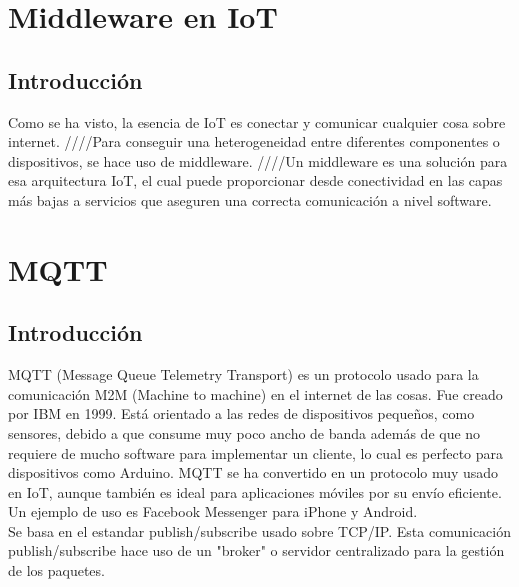 \documentclass[12pt, twoside]{book}
\begin{document}
\chapter{Middleware en IoT}
\section{Introducción}
Como se ha visto, la esencia de IoT es conectar y comunicar cualquier cosa sobre internet. ////Para conseguir una heterogeneidad entre diferentes componentes o dispositivos, se hace uso de middleware. ////Un middleware es una solución para esa arquitectura IoT, el cual puede proporcionar desde conectividad en las capas más bajas a servicios que aseguren una correcta comunicación a nivel software. 

\chapter{MQTT}
\section{Introducción}
MQTT (Message Queue Telemetry Transport) es un protocolo usado para la comunicación M2M (Machine to machine) en el internet de las cosas. Fue creado por IBM en 1999. Está orientado a las redes de dispositivos pequeños, como sensores, debido a que consume muy poco ancho de banda además de que no requiere de mucho software para implementar un cliente, lo cual es perfecto para dispositivos como Arduino. MQTT se ha convertido en un protocolo muy usado en IoT, aunque también es ideal para aplicaciones móviles por su envío eficiente. Un ejemplo de uso es Facebook Messenger para iPhone y Android.\\
Se basa en el estandar publish/subscribe usado sobre TCP/IP. Esta comunicación publish/subscribe hace uso de un "broker" o servidor centralizado para la gestión de los paquetes.
\end{document}
